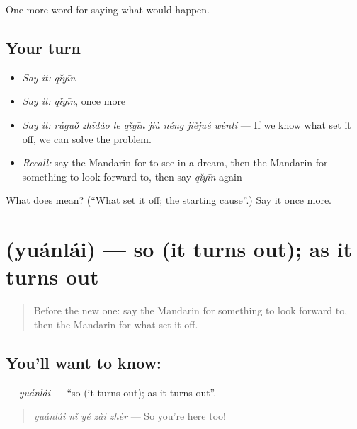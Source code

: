 \begin{grammarlens}[title={What you've built}]
One more word for saying what would happen.
\end{grammarlens}

\subsection*{Your turn}
\begin{itemize}
\raggedright
  \item \emph{Say it:} \emph{qǐyīn}
  \item \emph{Say it:} \emph{qǐyīn}, once more
  \item \emph{Say it:} \emph{rúguǒ zhīdào le qǐyīn jiù néng jiějué wèntí} — If we know what set it off, we can solve the problem.
  \item \emph{Recall:} say the Mandarin for to see in a dream, then the Mandarin for something to look forward to, then say \emph{qǐyīn} again
\end{itemize}

\begin{tcolorbox}[breakable,colback=teal!4,colframe=teal!35!black,title={Before you move on}]
What does  mean? (\textquotedblleft{}What set it off; the starting cause\textquotedblright{}.) Say it once more.
\end{tcolorbox}
\section[\texorpdfstring{\zh{原来} (yuánlái)}{原来 (yuánlái)}]{ (yuánlái) — so (it turns out); as it turns out}

\label{lesson:ZH-C537-yuanlai}



\begin{quote}
Before the new one: say the Mandarin for something to look forward to, then the Mandarin for what set it off.
\end{quote}

\subsection*{You'll want to know: }
\textbf{} — \emph{yuánlái} — \textquotedblleft{}so (it turns out); as it turns out\textquotedblright{}.

\begin{quote}
\textbf{} \emph{yuánlái nǐ yě zài zhèr} — So you're here too!
\end{quote}

